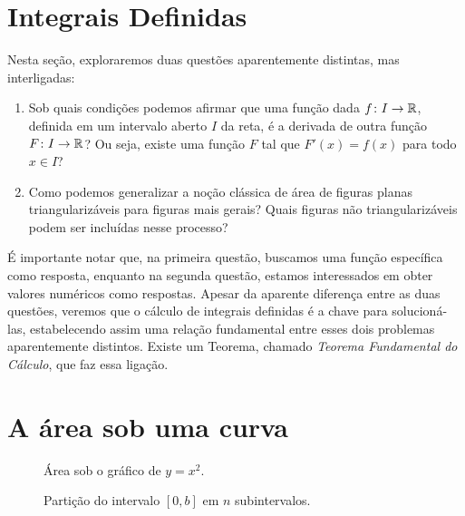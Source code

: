 \section{Integrais Definidas}
\label{sec:Integrais_Definidas}

Nesta seção, exploraremos duas questões aparentemente distintas, mas interligadas:
\begin{enumerate}
  \item Sob quais condições podemos afirmar que uma função dada
    $f\colon I \rightarrow \mathbb{R}$, definida em um intervalo aberto $I$ da reta,
    é a derivada de outra função $F\colon I \rightarrow \mathbb{R}$?
    Ou seja, existe uma função $F$ tal que $F'(x) = f(x)$ para todo $x \in I$?

    \item Como podemos generalizar a noção clássica de área de figuras planas
        triangularizáveis para figuras mais gerais?
        Quais figuras não triangularizáveis podem ser incluídas nesse processo?
\end{enumerate}
É importante notar que, na primeira questão, buscamos uma função específica como
resposta, enquanto na segunda questão, estamos interessados em obter valores
numéricos como respostas. Apesar da aparente diferença entre as duas questões,
veremos que o cálculo de integrais definidas é a chave para solucioná-las,
estabelecendo assim uma relação fundamental entre esses dois problemas
aparentemente distintos. Existe um Teorema, chamado
\textit{Teorema Fundamental do Cálculo}, que faz essa ligação.

\section{A área sob uma curva}
\begin{figure}
   \centering
   
   \caption{Área sob o gráfico de $y=x^2$.}
   \label{fig:areax2}
\end{figure}

\begin{figure}
   \centering
   
   \caption{Partição do intervalo $[0, b]$ em $n$ subintervalos.}
   \label{fig:particaox2}
\end{figure}


